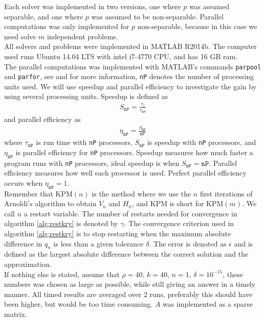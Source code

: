 Each solver was implemented in two versions, one where $p$ was assumed separable, and one where $p$ was assumed to be non-separable. Parallel computations was only implemented for $p$ non-separable, because in this case we need solve $m$ independent problems.\\%

All solvers and problems were implemented in MATLAB R2014b. The computer used runs Ubuntu 14.04 LTS with intel  i7-4770 CPU, and has 16 GB ram. \\

The parallel computations was implemented with MATLAB's commands \texttt{parpool} and \texttt{parfor}, see \cite{parpool} and \cite{parfor} for more information, \texttt{nP} denotes the number of processing units used. We will use speedup and parallel efficiency to investigate the gain by using several processing units. Speedup is defined as
\begin{align*}
S_\texttt{nP} = \frac{\tau_1}{\tau_\texttt{nP}}
\end{align*}
and parallel efficiency as
\begin{align*}
\eta_\texttt{nP} = \frac{S_\texttt{nP}}{\texttt{nP}}
\end{align*}
where $\tau_\texttt{nP}$ is run time with \texttt{nP} processors, $S_\texttt{nP}$ is speedup with \texttt{nP} processors, and $\eta_\texttt{nP}$ is parallel efficiency for \texttt{nP} processors. Speedup measures how much faster a program runs with \texttt{nP} processors, ideal speedup is when $S_\texttt{nP} = \texttt{nP}$. Parallel efficiency measures how well each processor is used. Perfect parallel efficiency occurs when $\eta_\texttt{nP} = 1$.\\

Remember that KPM$(n)$ is the method where we use the $n$ first iterations of Arnoldi's algorithm to obtain $V_n$ and $H_n$, and KPM is short for KPM$(m)$. We call $n$ a restart variable. The number of restarts needed for convergence in algorithm \ref{alg:restkry} is denoted by $\gamma$. The convergence criterion used in algorithm \ref{alg:restkry} is to stop restarting when the maximum absolute difference in $q_n$ is less than a given tolerance $\delta$. The error is denoted as $\epsilon$ and is defined as the largest absolute difference between the correct solution and the approximation. \\

If nothing else is stated, assume that $\rho =40$, $k = 40$, $n = 1$, $\delta = 10^{-15}$, these numbers was chosen as large as possible, while still giving an answer in a timely manner. All timed results are averaged over 2 runs, preferably this should have been higher, but would be too time consuming. $A$ was implemented as a sparse matrix.\\
 
